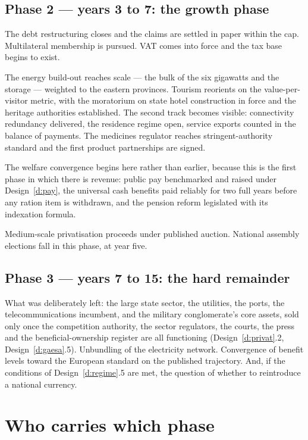 \subsection*{Phase 2 --- years 3 to 7: the growth phase}

The debt restructuring closes and the claims are settled in paper within the cap.
Multilateral membership is pursued. VAT comes into force and the tax base begins
to exist.

The energy build-out reaches scale --- the bulk of the six gigawatts and the
storage --- weighted to the eastern provinces. Tourism reorients on the
value-per-visitor metric, with the moratorium on state hotel construction in
force and the heritage authorities established. The second track becomes
visible: connectivity redundancy delivered, the residence regime open,
service exports counted in the balance of payments. The medicines regulator
reaches stringent-authority standard and the first product partnerships are
signed.

The welfare convergence begins here rather than earlier, because this is the
first phase in which there is revenue: public pay benchmarked and raised under
Design~\ref{d:pay}, the universal cash benefits paid reliably for two full years
before any ration item is withdrawn, and the pension reform legislated with its
indexation formula.

Medium-scale privatisation proceeds under published auction. National assembly
elections fall in this phase, at year five.

\subsection*{Phase 3 --- years 7 to 15: the hard remainder}

What was deliberately left: the large state sector, the utilities, the ports, the
telecommunications incumbent, and the military conglomerate's core assets, sold
only once the competition authority, the sector regulators, the courts, the press
and the beneficial-ownership register are all functioning
(Design~\ref{d:privat}.2, Design~\ref{d:gaesa}.5). Unbundling of the electricity
network. Convergence of benefit levels toward the European standard on the
published trajectory. And, if the conditions of Design~\ref{d:regime}.5 are met,
the question of whether to reintroduce a national currency.

\section{Who carries which phase}

